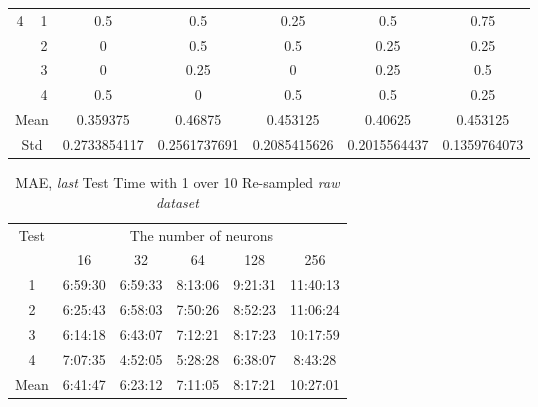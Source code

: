 \documentclass[draft,dvipsnames]{drexel-thesis}
\begin{document}
\begin{thesis}
\begin{table}[!t]
\begin{tabular}{|c|c|c|c|c|c|c|}
\multirow{4}{*}{4}    & 1                   & 0.5          & 0.5          & 0.25         & 0.5          & 0.75         \\ \cline{2-7}
                      & 2                   & 0            & 0.5          & 0.5          & 0.25         & 0.25         \\ \cline{2-7}
                      & 3                   & 0            & 0.25         & 0            & 0.25         & 0.5          \\ \cline{2-7}
                      & 4                   & 0.5          & 0            & 0.5          & 0.5          & 0.25         \\ \hline
\multicolumn{2}{|c|}{Mean}                  & 0.359375     & 0.46875      & 0.453125     & 0.40625      & 0.453125     \\ \hline
\multicolumn{2}{|c|}{Std}                   & 0.2733854117 & 0.2561737691 & 0.2085415626 & 0.2015564437 & 0.1359764073 \\ \hline
\end{tabular}
\end{table}

\begin{table}[!t]
\centering
\caption{MAE, {\em last} Test Time with 1 over 10 Re-sampled {\em raw dataset}}
\label{tbl:mae_last_1_10_time}
\begin{tabular}{|c|c|c|c|c|c|}
\hline
\multirow{2}{*}{Test} & \multicolumn{5}{c|}{The number of neurons}       \\ \cline{2-6}
                      & 16      & 32      & 64      & 128     & 256      \\ \hline
1                     & 6:59:30 & 6:59:33 & 8:13:06 & 9:21:31 & 11:40:13 \\ \hline
2                     & 6:25:43 & 6:58:03 & 7:50:26 & 8:52:23 & 11:06:24 \\ \hline
3                     & 6:14:18 & 6:43:07 & 7:12:21 & 8:17:23 & 10:17:59 \\ \hline
4                     & 7:07:35 & 4:52:05 & 5:28:28 & 6:38:07 & 8:43:28  \\ \hline
Mean                  & 6:41:47 & 6:23:12 & 7:11:05 & 8:17:21 & 10:27:01 \\ \hline
\end{tabular}
\end{table}


\end{thesis}
\end{document}
